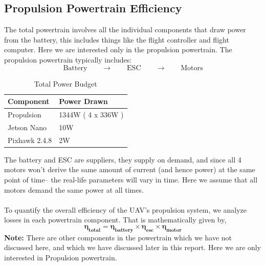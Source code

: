 \documentclass[12pt]{report}
\begin{document}
      \vspace{0.5cm}
      
      \subsection{Propulsion Powertrain Efficiency}
      The total powertrain involves all the individual components that draw power from the battery, this includes things like the flight controller and flight computer. Here we are interested only in the propulsion powertrain. The propulsion powertrain typically includes: \[ \text{Battery} \quad \quad \rightarrow \quad \quad  \text{ESC} \quad \quad \rightarrow \quad \quad \text{Motors} \]
      \begin{table}[H]
      \centering
      \caption{Total Power Budget}
        \begin{tabular}{|>{\raggedright\arraybackslash}p{6cm}|>{\raggedright\arraybackslash}p{6cm}|}
          \hline
          \textbf{Component} & \textbf{Power Drawn} \\
          \hline
          Propulsion & 1344W  ( {\small 4 x 336W} ) \\
          Jetson Nano & 10W \\
          Pixhawk 2.4.8 & 2W\\
          \hline
        \end{tabular}
      \end{table}

      The battery and ESC are suppliers, they supply on demand, and since all 4 motors won't derive the same amount of current (and hence power) at the same point of time-- the real-life parameters will vary in time. Here we assume that all motors demand the same power at all times.\\ \\ To quantify the overall efficiency of the UAV’s propulsion system, we analyze losses in each powertrain component. That is mathematically given by, 
      \[ 
      \boldsymbol{\eta_{total} = \eta_{battery} \times \eta_{esc} \times \eta_{motor}}
      \]
      \textbf{Note:} There are other components in the powertrain which we have not discussed here, and which we have discussed later in this report. Here we are only interested in Propulsion powertrain. \\
\end{document}
